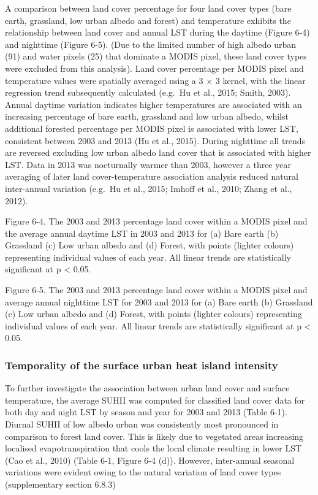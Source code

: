 \documentclass[]{book}
\begin{document}
A comparison between land cover percentage for four land cover types
(bare earth, grassland, low urban albedo and forest) and temperature
exhibits the relationship between land cover and annual LST during the
daytime (Figure 6-4) and nighttime (Figure 6-5). (Due to the limited
number of high albedo urban (91) and water pixels (25) that dominate a
MODIS pixel, these land cover types were excluded from this analysis).
Land cover percentage per MODIS pixel and temperature values were
spatially averaged using a 3 × 3 kernel, with the linear regression
trend subsequently calculated (e.g.~Hu et al., 2015; Smith, 2003).
Annual daytime variation indicates higher temperatures are associated
with an increasing percentage of bare earth, grassland and low urban
albedo, whilst additional forested percentage per MODIS pixel is
associated with lower LST, consistent between 2003 and 2013 (Hu et al.,
2015). During nighttime all trends are reversed excluding low urban
albedo land cover that is associated with higher LST. Data in 2013 was
nocturnally warmer than 2003, however a three year averaging of later
land cover-temperature association analysis reduced natural inter-annual
variation (e.g.~Hu et al., 2015; Imhoff et al., 2010; Zhang et al.,
2012).

Figure 6-4. The 2003 and 2013 percentage land cover within a MODIS pixel
and the average annual daytime LST in 2003 and 2013 for (a) Bare earth
(b) Grassland (c) Low urban albedo and (d) Forest, with points (lighter
colours) representing individual values of each year. All linear trends
are statistically significant at p \textless{} 0.05.

Figure 6-5. The 2003 and 2013 percentage land cover within a MODIS pixel
and average annual nighttime LST for 2003 and 2013 for (a) Bare earth
(b) Grassland (c) Low urban albedo and (d) Forest, with points (lighter
colours) representing individual values of each year. All linear trends
are statistically significant at p \textless{} 0.05.

\subsubsection{Temporality of the surface urban heat island
intensity}\label{temporality-of-the-surface-urban-heat-island-intensity}

To further investigate the association between urban land cover and
surface temperature, the average SUHII was computed for classified land
cover data for both day and night LST by season and year for 2003 and
2013 (Table 6-1). Diurnal SUHII of low albedo urban was consistently
most pronounced in comparison to forest land cover. This is likely due
to vegetated areas increasing localised evapotranspiration that cools
the local climate resulting in lower LST (Cao et al., 2010) (Table 6-1,
Figure 6-4 (d)). However, inter-annual seasonal variations were evident
owing to the natural variation of land cover types (supplementary
section 6.8.3)
\end{document}
